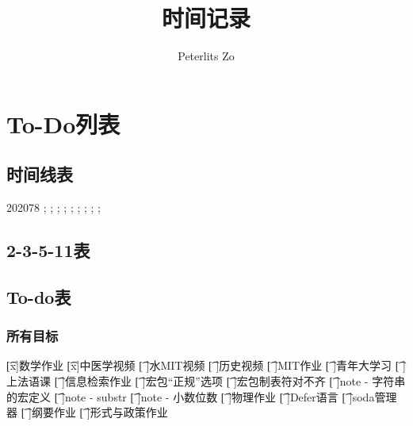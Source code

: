 \documentclass{peterlitsdoc}
\title{时间记录}
\author{Peterlits Zo}
\begin{document}
\maketitle
\tableofcontents
\newpage


\section{To-Do列表}

\subsection{时间线表}

\begin{plttimeline}{2020}{7}{8}
    ;
    ;
    ;
    ;
    ;
    ;
    ;
    ;
    ;
\end{plttimeline}

\subsection{2-3-5-11表}

% 
% 

\subsection{To-do表}

\subsubsection{所有目标}

\bigskip

\begin{plttodoenv}{4}
\t[x]数学作业      
\t[x]中医学视频
\t[ ]水MIT视频                         
\t[ ]历史视频
\t[ ]MIT作业       
\t[ ]青年大学习                        
\t[ ]上法语课
\t[ ]信息检索作业  
\t[ ]宏包“正规”选项
\t[ ]宏包制表符对不齐
\t[ ]note - 字符串的宏定义
\t[ ]note - substr
\t[ ]note - 小数位数
\t[ ]物理作业
\t[ ]Defer语言
\t[ ]soda管理器
\t[ ]纲要作业
\t[ ]形式与政策作业
\end{plttodoenv}
\end{document}
